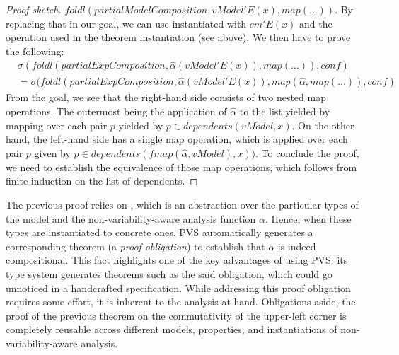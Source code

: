 \begin{proof}[Proof sketch]
$\mathit{foldl(partialModelComposition,vModel'E(x),map(...))}$.
By replacing that in our goal, we can use  %
instantiated with %
$\mathit{cm'E(x)}$ 
and the %
operation used in the theorem instantiation (see above). 
We then have to prove the following:  
\begin{equation*}
\begin{split}
& \mathit{\sigma(foldl(partialExpComposition,\hat\alpha(vModel'E(x)),map(...)),conf)}\\
& = \mathit{\sigma(foldl(partialExpComposition,\hat\alpha(vModel'E(x)),map(\hat\alpha,map(...)),conf)}
\end{split}
\end{equation*}
From the goal, we see that the right-hand side consists of two nested map operations. The outermost being the application of $\hat\alpha$ to the list yielded by mapping over each pair $p$ yielded by $p \in \mathit{dependents(vModel, x)}$. %
On the other hand, the left-hand side has a single map operation, which is applied over each pair $p$ given by $p \in \mathit{dependents(\text{fmap}(\hat\alpha,vModel), x))}$. %
To conclude the proof, we need to establish the equivalence of those map operations, which follows from finite induction on the list of dependents.
\end{proof}

The previous proof relies on , %
which is an abstraction over the particular types of the model and the non-variability-aware analysis function $\alpha$.
Hence, when these types are instantiated to concrete ones, PVS automatically generates a corresponding theorem (a \emph{proof obligation}) to establish that $\alpha$ is indeed compositional.
This fact highlights one of the key advantages of using PVS: its type system generates theorems such as the said obligation, which could go unnoticed in a handcrafted specification.
While addressing this proof obligation requires some effort, it is inherent to the analysis at hand.
Obligations aside, the proof of the previous theorem on the commutativity of the upper-left corner is completely reusable across different models, properties, and instantiations of non-variability-aware analysis.
